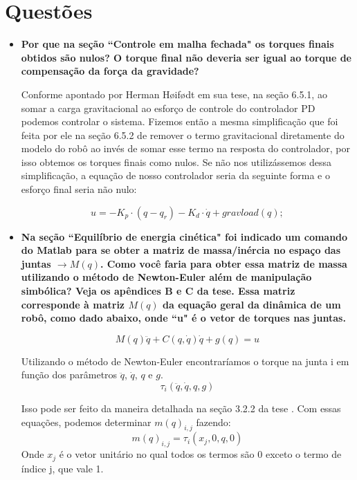 \documentclass{article}
\begin{document}
\section{Questões}
\begin{itemize}
	\item \textbf{Por que na seção ``Controle em malha fechada" os torques finais obtidos são nulos? O torque final não deveria ser igual ao torque de compensação da força da gravidade?}
	
	Conforme apontado por Herman Høifødt\cite{bb:tese} em sua tese, na seção 6.5.1, ao somar a carga gravitacional ao esforço de controle do controlador PD podemos controlar o sistema. Fizemos então a mesma simplificação que foi feita por ele na seção 6.5.2 de remover o termo gravitacional diretamente do modelo do robô ao invés de somar esse termo na resposta do controlador, por isso obtemos os torques finais como nulos.
	Se não nos utilizássemos dessa simplificação, a equação de nosso controlador seria da seguinte forma e o esforço final seria não nulo:
	
	\begin{equation}
		u = -K_p\cdot (q - q_r) -K_d\cdot\dot{q} + gravload(q);
	\end{equation}
	
	\item \textbf{Na seção ``Equilíbrio de energia cinética" foi indicado um comando do Matlab para se obter a matriz de massa/inércia no espaço das juntas $\rightarrow M(q)$. Como você faria para obter essa matriz de massa utilizando o método de Newton-Euler além de manipulação simbólica? Veja os apêndices B e C da tese\cite{bb:tese}. Essa matriz corresponde à matriz $M(q)$ da equação geral da dinâmica de um robô, como dado abaixo, onde ``u" é o vetor de torques nas juntas.}
	
	\begin{equation}
	\label{eq:mq}
	M(q)\ddot{q}+C(q,\dot{q})\dot{q}+g(q)=u
	\end{equation}
	
	Utilizando o método de Newton-Euler encontraríamos o torque na junta i  em função dos parâmetros $\ddot{q}$, $\dot{q}$, $q$ e $g$.
	\begin{equation}
		\tau_i(\ddot{q}, \dot{q}, q, g)
	\end{equation} 
	
	Isso pode ser feito da maneira detalhada na seção 3.2.2 da tese \cite{bb:tese}. Com essas equações, podemos determinar $m(q)_{i,j}$ fazendo:
	\begin{equation}
		m(q)_{i,j} = \tau_i(x_j, 0, q, 0)
	\end{equation}
	Onde $x_j$ é o vetor unitário no qual todos os termos são 0 exceto o termo de índice j, que vale 1.
	

\end{itemize}
\end{document}

